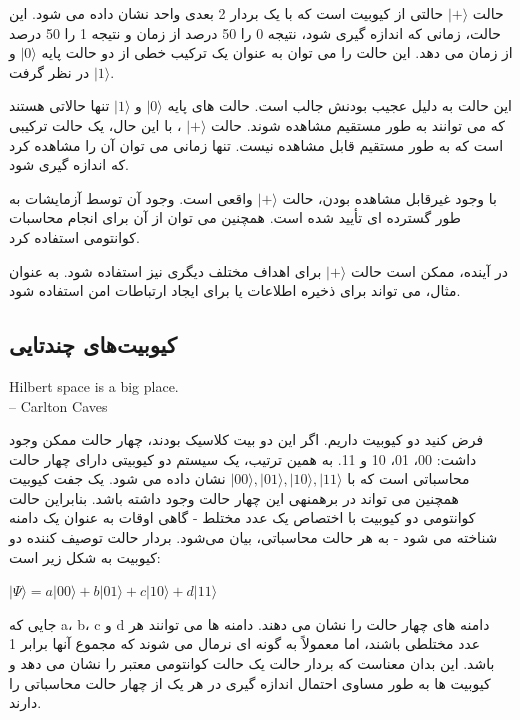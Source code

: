 \documentclass{book}
\begin{document}
حالت $\vert+\rangle$ حالتی از کیوبیت است که با یک بردار 2 بعدی واحد نشان داده می شود. این حالت، زمانی که اندازه گیری شود، نتیجه 0 را 50 درصد از زمان و نتیجه 1 را 50 درصد از زمان می دهد. این حالت را می توان به عنوان یک ترکیب خطی از دو حالت پایه $\vert0\rangle$ و $\vert 1 \rangle$ در نظر گرفت.

این حالت به دلیل عجیب بودنش جالب است. حالت های پایه $\vert 0 \rangle$ و $\vert 1 \rangle$ تنها حالاتی هستند که می توانند به طور مستقیم مشاهده شوند. حالت $\vert + \rangle$ ، با این حال، یک حالت ترکیبی است که به طور مستقیم قابل مشاهده نیست. تنها زمانی می توان آن را مشاهده کرد که اندازه گیری شود.

با وجود غیرقابل مشاهده بودن، حالت $\vert + \rangle$ واقعی است. وجود آن توسط آزمایشات به طور گسترده ای تأیید شده است. همچنین می توان از آن برای انجام محاسبات کوانتومی استفاده کرد.

در آینده، ممکن است حالت $\vert + \rangle$ برای اهداف مختلف دیگری نیز استفاده شود. به عنوان مثال، می تواند برای ذخیره اطلاعات یا برای ایجاد ارتباطات امن استفاده شود.
\pagebreak
\subsection{کیوبیت‌های چندتایی}

\begin{latin}
	Hilbert space is a big place.\\
	\hspace{2cm}– Carlton Caves
\end{latin}




فرض کنید دو کیوبیت داریم. اگر این دو بیت کلاسیک بودند، چهار حالت ممکن وجود داشت: 00، 01، 10 و 11. به همین ترتیب، یک سیستم دو کیوبیتی دارای چهار حالت محاسباتی است که با $\vert 00 \rangle, \vert 01 \rangle, \vert 10 \rangle, \vert 11 \rangle$ نشان داده می شود. یک جفت کیوبیت همچنین می تواند در برهمنهی این چهار حالت وجود داشته باشد.
بنابراین حالت کوانتومی دو کیوبیت با اختصاص یک عدد مختلط - گاهی اوقات به عنوان یک دامنه شناخته می شود - به هر حالت محاسباتی، بیان می‌شود. بردار حالت توصیف کننده دو کیوبیت به شکل زیر است:
\begin{center}
	$\vert \Psi \rangle = a \vert00\rangle + b \vert01\rangle + c \vert10\rangle + d \vert11\rangle $
\end{center}

جایی که a، b، c و d دامنه های چهار حالت را نشان می دهند. دامنه ها می توانند هر عدد مختلطی باشند، اما معمولاً به گونه ای نرمال می شوند که مجموع آنها برابر 1 باشد. این بدان معناست که بردار حالت یک حالت کوانتومی معتبر را نشان می دهد و کیوبیت ها به طور مساوی احتمال اندازه گیری در هر یک از چهار حالت محاسباتی را دارند.
\end{document}

